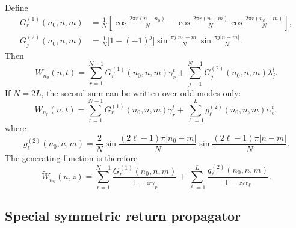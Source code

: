 \documentclass[11pt]{article}
\newcommand{\wt}{\widetilde}
\newcommand{\abs}[1]{\left|#1\right|}
\begin{document}
Define
\begin{align}
  G^{(1)}_r(n_0,n,m)&=\frac{1}{N}
  \left[
  \cos\frac{2\pi r(n-n_0)}{N}
  -\cos\frac{2\pi r(n-m)}{N}\cos\frac{2\pi r(n_0-m)}{N}
  \right],\\
  G^{(2)}_j(n_0,n,m)&=\frac{1}{N}\bigl[1-(-1)^j\bigr]
  \sin\frac{\pi j\abs{n_0-m}}{N}
  \sin\frac{\pi j\abs{n-m}}{N}.
\end{align}
Then
\begin{equation}
  W_{n_0}(n,t)=\sum_{r=1}^{N-1}G^{(1)}_r(n_0,n,m)\gamma_r^t
  +\sum_{j=1}^{N-1}G^{(2)}_j(n_0,n,m)\lambda_j^t.
  \label{eq:W-compact-full}
\end{equation}
If $N=2L$, the second sum can be written over odd modes only:
\begin{equation}
  W_{n_0}(n,t)=\sum_{r=1}^{N-1}G^{(1)}_r(n_0,n,m)\gamma_r^t
  +\sum_{\ell=1}^{L}g^{(2)}_\ell(n_0,n,m)\alpha_\ell^t,
  \label{eq:W-compact-odd}
\end{equation}
where
\begin{equation}
  g^{(2)}_\ell(n_0,n,m)=\frac{2}{N}
  \sin\frac{(2\ell-1)\pi\abs{n_0-m}}{N}
  \sin\frac{(2\ell-1)\pi\abs{n-m}}{N}.
\end{equation}
The generating function is therefore
\begin{equation}
  \wt W_{n_0}(n,z)=\sum_{r=1}^{N-1}\frac{G^{(1)}_r(n_0,n,m)}{1-z\gamma_r}
  +\sum_{\ell=1}^{L}\frac{g^{(2)}_\ell(n_0,n,m)}{1-z\alpha_\ell}.
  \label{eq:W-gen-compact}
\end{equation}

\subsection{Special symmetric return propagator}
\label{sec:WLL}
\end{document}
